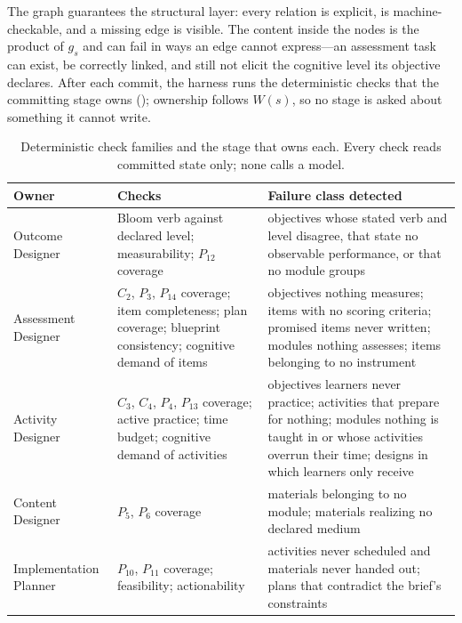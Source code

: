 The graph guarantees the structural layer: every relation is explicit,
 is machine-checkable, and a missing edge is visible. The content
inside the nodes is the product of $g_s$ and can fail in ways an edge cannot
express---an assessment task can exist, be correctly linked, and still not elicit
the cognitive level its objective declares. After each commit, the harness runs the
deterministic checks that the committing stage owns ();
ownership follows $W(s)$, so no stage is asked about something it cannot write.

\begin{table}[t]
  \caption{Deterministic check families and the stage that owns each. Every check
  reads committed state only; none calls a model.}
  \label{tab:checks}
  \small
  \begin{tabular}{@{}p{}p{}p{}@{}}
    \toprule
    Owner & Checks & Failure class detected \\
    \midrule
    Outcome Designer & Bloom verb against declared level; measurability;
    $P_{12}$ coverage &
    objectives whose stated verb and level disagree, that state no observable
    performance, or that no module groups \\
    Assessment Designer & $C_2$, $P_3$, $P_{14}$ coverage; item completeness;
    plan coverage; blueprint consistency; cognitive demand of items &
    objectives nothing measures; items with no scoring criteria; promised items
    never written; modules nothing assesses; items belonging to no instrument \\
    Activity Designer & $C_3$, $C_4$, $P_4$, $P_{13}$ coverage; active practice;
    time budget; cognitive demand of activities &
    objectives learners never practice; activities that prepare for nothing;
    modules nothing is taught in or whose activities overrun their time; designs
    in which learners only receive \\
    Content Designer & $P_5$, $P_6$ coverage &
    materials belonging to no module; materials realizing no declared medium \\
    Implementation Planner & $P_{10}$, $P_{11}$ coverage; feasibility;
    actionability &
    activities never scheduled and materials never handed out; plans that
    contradict the brief's constraints \\
    \bottomrule
  \end{tabular}
\end{table}

